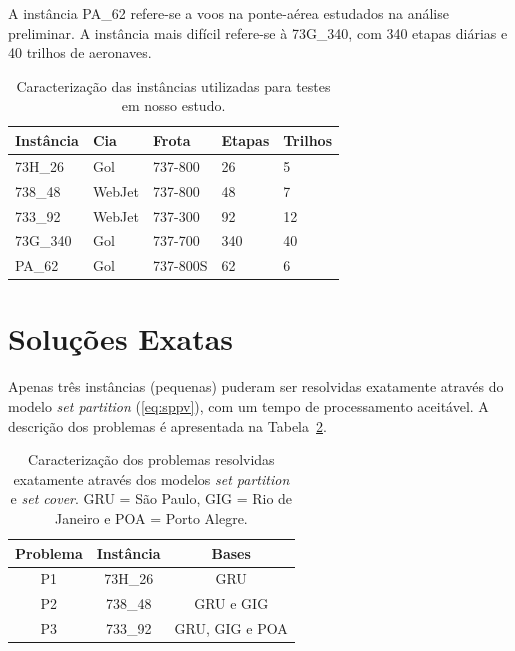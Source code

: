 A instância PA\_62 refere-se a voos na ponte-aérea estudados na análise preliminar. A instância mais
difícil refere-se à 73G\_340, com 340 etapas diárias e 40 trilhos de aeronaves.

\begin{table}[htb]
	\begin{center} 
		\begin{tabular}{|l|l|l|l|l|}
			\hline 
			{\bf Instância} & {\bf Cia} & {\bf Frota} & {\bf Etapas} & {\bf Trilhos} \\ 
			\hline \hline
			73H\_26 & Gol & 737-800 & 26 & 5 \\ 
			738\_48 & WebJet & 737-800 & 48 & 7 \\ 
			733\_92 & WebJet & 737-300 & 92 & 12 \\
			73G\_340 & Gol & 737-700 & 340 & 40 \\
			PA\_62 & Gol & 737-800S & 62 & 6 \\ \hline
		\end{tabular}
		\caption{Caracterização das instâncias utilizadas para testes em nosso estudo.}
		\label{tab:instancias}
	\end{center}
\end{table}


\section{Soluções Exatas}
\label{sec:solucoes_exatas}

Apenas três instâncias (pequenas) puderam ser resolvidas exatamente através do modelo {\it set
partition} (\ref{eq:sppv}), com um tempo de processamento aceitável. A descrição dos problemas é
apresentada na Tabela~\ref{tab:problemas}.

\begin{table}[htb]
	\begin{center} 
		\begin{tabular}{|c|c|c|}
			\hline 
			{\bf Problema} & {\bf Instância} & {\bf Bases} \\ 
			\hline \hline
			P1 & 73H\_26 & GRU \\ 
			P2 & 738\_48 & GRU e GIG \\ 
			P3 & 733\_92 & GRU, GIG e POA \\ \hline
		\end{tabular}
		\caption{Caracterização dos problemas resolvidas exatamente através dos modelos 
		{\it set partition} e {\it set cover}. GRU = São Paulo, GIG = Rio de Janeiro e POA = Porto
    Alegre.}
		\label{tab:problemas}
	\end{center}
\end{table}

